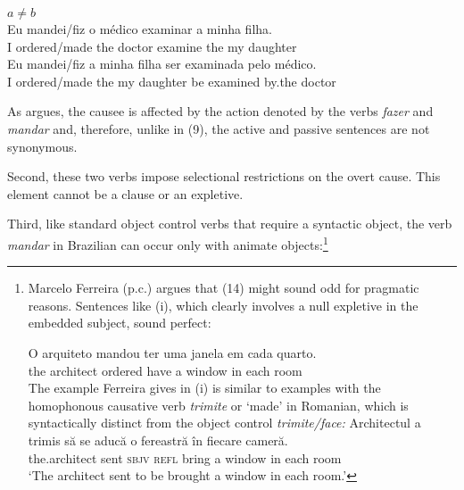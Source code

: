 \documentclass[output=paper]{langsci/langscibook}
\begin{document}
\ea%
           $a \neq b$\label{ex:moreno:10}\\
    \ea
    \gll Eu   mandei/fiz      o    médico   examinar  a    minha filha.\\
         I         ordered/made the doctor     examine    the my     daughter\\
    \ex  
    \gll Eu   mandei/fiz    a     minha filha      ser examinada pelo    médico.\\
         I         ordered/made the  my      daughter  be examined    by.the doctor\\
    \z
\z    

As \citet{Farrell1995} argues, the causee is affected by the action denoted by the verbs \textit{fazer} and \textit{mandar} and, therefore, unlike in (9), the active and passive sentences are not synonymous.

Second, these two verbs impose selectional restrictions on the overt cause. This element cannot be a clause or an expletive. 

    \z



\z

Third, like standard object control verbs that require a syntactic object, the verb \textit{mandar} in Brazilian  can occur only with animate objects:\footnote{Marcelo Ferreira (p.c.) argues that (14) might sound odd for pragmatic reasons. Sentences like (i), which clearly involves a null expletive in the~ embedded subject, sound perfect:

\ea \gll  O   arquiteto mandou   ter    uma janela    em cada quarto.\\
the architect  ordered   have a      window in  each  room\\
\z The example Ferreira gives in (i) is similar to examples with the homophonous causative verb \textit{trimite} or ‘made’ in Romanian, which is syntactically distinct from the object control \textit{trimite\slash face:}
\ea \gll Architectul   {a trimis} să     se    aducă       o fereastră în fiecare cameră.\\
         the.architect sent       \textsc{sbjv} \textsc{refl} bring a window   in each room\\
    \glt ‘The architect sent to be brought a window in each room.’
\z}
\end{document}
